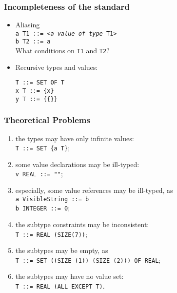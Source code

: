\documentclass[compress,dvips,xcolor={dvipsnames},t]{beamer}
\begin{document}
\begin{frame}[containsverbatim]
\frametitle{Incompleteness of the standard}

\begin{itemize}

  \item Aliasing\\
        \texttt{a T1 ::= <\emph{a value of type} T1>}\\
        \texttt{b T2 ::= a} \\
        What conditions on \texttt{T1} and \texttt{T2}?

  \item Recursive types and values:
\begin{verbatim}
T ::= SET OF T
x T ::= {x}
y T ::= {{}} 
\end{verbatim}

\end{itemize}

\end{frame}

\begin{frame}
\frametitle{Theoretical Problems}

\begin{enumerate}
  
  \item \label{finiteness} the types may have only infinite
        values:\\
        \texttt{T ::= SET \{a T\}};

  \item \label{type_conformance} some value declarations may be
        ill-typed:\\
        \texttt{v REAL ::= ""};

  \item \label{type_compatibility} especially, some value references
        may be ill-typed, as\\
        \texttt{a VisibleString ::= b}\\
        \texttt{b INTEGER ::= 0};

  \item \label{constraint_consistence} the subtype constraints may
        be inconsistent:\\
        \texttt{T ::= REAL (SIZE(7))};

  \item \label{subtype_non_emptyness} the subtypes may be empty, as\\
        \texttt{T ::= SET ((SIZE (1))  (SIZE (2))) OF REAL};
        
  \item \label{solvability} the subtypes may have no value set:\\
        \texttt{T ::= REAL (ALL EXCEPT T)}. 

\end{enumerate}

\end{frame}
\end{document}
